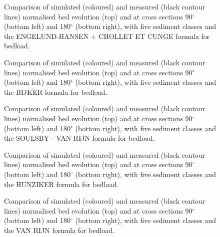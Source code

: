 \begin{figure} [!h]
\centering
{}
\caption{Comparison of simulated (coloured) and measured (black contour lines) normalised bed evolution (top) and  at cross sections 90$^{\circ}$ (bottom left) and 180$^{\circ}$ (bottom right),
with five sediment classes and the ENGELUND-HANSEN + CHOLLET ET CUNGE formula for bedload.}\label{fig:results_multi3}
\end{figure}
\begin{figure} [!h]
\centering
{}
\caption{Comparison of simulated (coloured) and measured (black contour lines) normalised bed evolution (top) and  at cross sections 90$^{\circ}$ (bottom left) and 180$^{\circ}$ (bottom right),
with five sediment classes and the BIJKER formula for bedload.}\label{fig:results_multi4}
\end{figure}
\begin{figure} [!h]
\centering
{}
\caption{Comparison of simulated (coloured) and measured (black contour lines) normalised bed evolution (top) and  at cross sections 90$^{\circ}$ (bottom left) and 180$^{\circ}$ (bottom right),
with five sediment classes and the SOULSBY - VAN RIJN formula for bedload.}\label{fig:results_multi5}
\end{figure}
\begin{figure} [!h]
\centering
{}
\caption{Comparison of simulated (coloured) and measured (black contour lines) normalised bed evolution (top) and  at cross sections 90$^{\circ}$ (bottom left) and 180$^{\circ}$ (bottom right),
with five sediment classes and the HUNZIKER formula for bedload.}\label{fig:results_multi6}
\end{figure}
\begin{figure} [!h]
\centering
{}
\caption{Comparison of simulated (coloured) and measured (black contour lines) normalised bed evolution (top) and  at cross sections 90$^{\circ}$ (bottom left) and 180$^{\circ}$ (bottom right),
with five sediment classes and the VAN RIJN formula for bedload.}\label{fig:results_multi7}
\end{figure}
